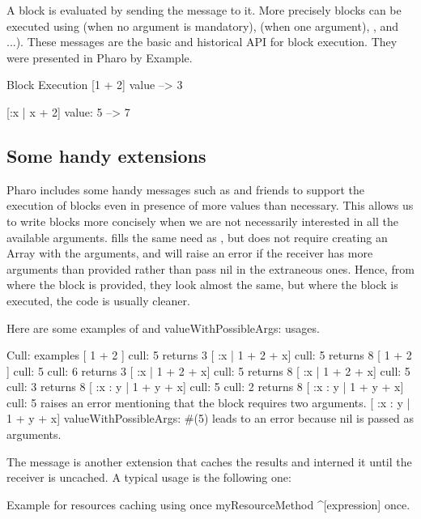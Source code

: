 \documentclass[a4paper,10pt,twoside]{book}
\begin{document}
 A block is evaluated by sending the  message to it. More precisely blocks can be executed using  (when no argument is mandatory),  (when one argument), ,   and ...). These messages are the basic and historical API for block execution. They were presented in Pharo by Example. 
 

\begin{code}{Block Execution}
[1 + 2] value  
    --> 3
    
[:x | x + 2] value: 5
    --> 7
\end{code}

\subsection{Some handy extensions}
Pharo includes some handy messages such as  and friends to support the execution of blocks even in presence of more values than necessary. This allows us to write blocks more concisely when we are not necessarily interested in all the available arguments.
 fills the same need as  , but does not require creating an Array with the arguments, and will raise an error if the receiver has more arguments than provided rather than pass nil in the extraneous ones. 
Hence, from where the block is provided, they look almost the same, but where the block is executed, the code is usually cleaner.

Here are some examples of  and  valueWithPossibleArgs: usages.
\begin{code}{Cull: examples}
[ 1 + 2 ] cull: 5
	returns 3
[ :x | 1 + 2 + x] cull: 5 
	returns 8
[ 1 + 2 ] cull: 5 cull: 6
	returns 3
[ :x | 1 + 2 + x] cull: 5 
	returns 8
[ :x | 1 + 2 + x] cull: 5 cull: 3	
	returns 8 
[ :x : y | 1 + y + x] cull: 5 cull: 2 
	returns 8
[ :x : y | 1 + y + x] cull: 5 
	raises an error mentioning that the block requires two arguments.
[ :x : y | 1 + y + x] valueWithPossibleArgs: #(5) 
	leads to an error because nil is passed as arguments.	
\end{code}

The message  is another extension that caches the results and interned it until the receiver is uncached.
A typical usage is the following one:

\begin{method}{Example for resources caching using once}
myResourceMethod
	^[expression] once.
\end{method}
\end{document}

